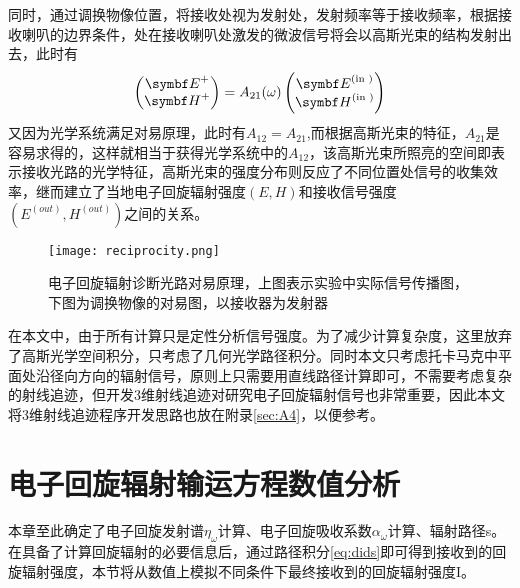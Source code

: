 同时，通过调换物像位置，将接收处视为发射处，发射频率等于接收频率，根据接收喇叭的边界条件，处在接收喇叭处激发的微波信号将会以高斯光束的结构发射出去，此时有
\begin{equation}
\left(\begin{matrix}
\vE^+ \\
\vH^+
\end{matrix}\right)=A_{21}(\omega)\left(\begin{matrix}
\vE^{(\text {in })} \\
\vH^{(\text {in })}
\end{matrix}\right)
\end{equation}
又因为光学系统满足对易原理，此时有$A_{12}=A_{21}$,而根据高斯光束的特征，$A_{21}$是容易求得的，这样就相当于获得光学系统中的$A_{12}$，该高斯光束所照亮的空间即表示接收光路的光学特征，高斯光束的强度分布则反应了不同位置处信号的收集效率，继而建立了当地电子回旋辐射强度$(E,H)$和接收信号强度$(E^{(out)},H^{(out)})$之间的关系。
\begin{figure}[H]
\centering
\texttt{[image: reciprocity.png]}
\caption{\label{fig:recp_ece}电子回旋辐射诊断光路对易原理，上图表示实验中实际信号传播图，下图为调换物像的对易图，以接收器为发射器}
\end{figure}
在本文中，由于所有计算只是定性分析信号强度。为了减少计算复杂度，这里放弃了高斯光学空间积分，只考虑了几何光学路径积分。同时本文只考虑托卡马克中平面处沿径向方向的辐射信号，原则上只需要用直线路径计算即可，不需要考虑复杂的射线追迹，但开发3维射线追迹对研究电子回旋辐射信号也非常重要，因此本文将3维射线追迹程序开发思路也放在附录\autoref{sec:A4}，以便参考。
\section{电子回旋辐射输运方程数值分析}
本章至此确定了电子回旋发射谱$η_\omega$计算、电子回旋吸收系数$α_\omega$计算、辐射路径s。在具备了计算回旋辐射的必要信息后，通过路径积分\autoref{eq:dids}即可得到接收到的回旋辐射强度，本节将从数值上模拟不同条件下最终接收到的回旋辐射强度I。
